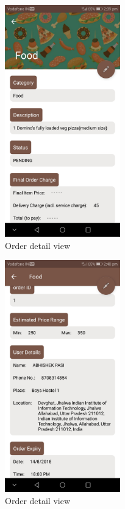 \documentclass{report}
\begin{document}
\begin{figure}[h!]
\begin{subfigure}[b]{.3\textwidth}
\centering
\includegraphics[width=5cm]{order_detail1.jpg}
\caption{\centering Order detail view}
\end{subfigure}
\begin{subfigure}[b]{.3\textwidth}
\centering
\includegraphics[width=5cm]{order_detail2.jpg}
\caption{\centering Order detail view}
\end{subfigure}
\begin{subfigure}[b]{.3\textwidth}
\centering

\end{subfigure}
\end{figure}
\end{document}
